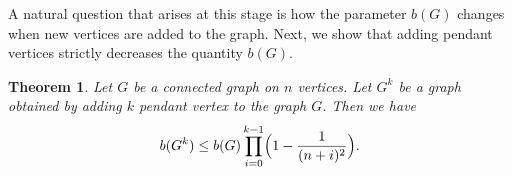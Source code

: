 \documentclass[12pt]{article}
\newtheorem{theorem}{Theorem}[section]
\newtheorem{remark}{Remark}[section]
\begin{document}







A natural question that arises at this stage is how the parameter $b(G)$ changes when new vertices are added to the graph. Next, we show that adding pendant vertices strictly decreases the quantity $b(G)$.

\begin{theorem}\label{vertex-add}
 Let $G$ be a connected graph on $n$ vertices. Let $G^k$ be a graph obtained by adding $k$ pendant vertex to the graph $G$. Then we have 
 $$
b(G^k) \leq b(G) \prod_{i=0}^{k-1} \Bigl(1-\frac{1}{(n+i)^2}\Bigl).
 $$

\end{theorem}
\end{document}
